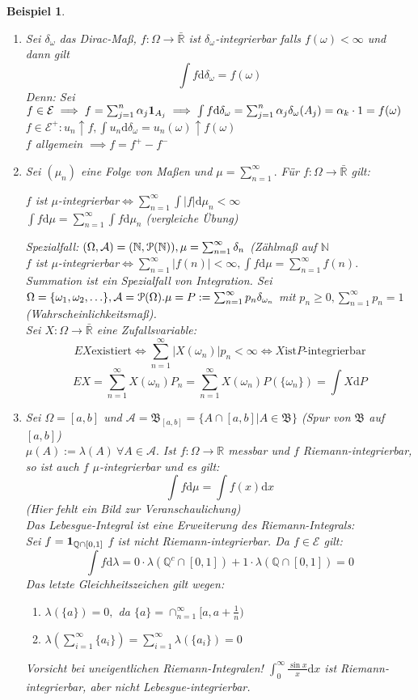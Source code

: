 \documentclass[a4paper,11pt]{book}
\newcommand{\R}{{\mathbb R}}
\newcommand{\N}{{\mathbb N}}
\newcommand{\Q}{{\mathbb Q}}
\newcommand{\ind}{\text{\bf{1}}}
\def\AA{ \mathcal{A} }
\def\PM{ \EuScript{P} }
\def\EE{ \mathcal{E} }
\def\BB{ \mathfrak{B} }
\def\folgt{\ensuremath{\implies}}
\def\equizu{\ensuremath{\iff}}
\def\d{\mbox{d}}
\newtheorem{Bsp}{Beispiel}[chapter]
\theoremstyle{nonumberplain}
\begin{document}
\begin{Bsp}
\begin{enumerate}
\item[a)] Sei $\delta_\omega$ das Dirac-Maß, $f:\Omega\to\bar\R$ ist $\delta_\omega$-integrierbar falls $f(\omega)<\infty$ und dann gilt
$$\int f\mbox{d}\delta_\omega=f(\omega)$$
Denn: Sei $f\in\EE\folgt f=\sum_{j=1}^n \alpha_j \ind_{A_j}\folgt \int f\d\delta_\omega=\sum_{j=1}^n\alpha_j\delta_\omega(A_j)=\alpha_k\cdot 1=f(\omega)$\\
$f\in\EE^+:u_n\uparrow f, \int u_n\d\delta_\omega=u_n(\omega)\uparrow f(\omega)$\\
$f$ allgemein $\folgt f=f^+-f^-$
\item[b)] Sei $(\mu_n)$ eine Folge von Maßen und $\mu=\sum_{n=1}^\infty.$ Für $f:\Omega\to\bar\R$ gilt:
\begin{center}
$f$ ist $\mu$-integrierbar$\equizu\sum_{n=1}^\infty\int |f|\d\mu_n<\infty$\\
$\int f\d\mu = \sum_{n=1}^\infty\int f\d\mu_n$ (vergleiche Übung)
\end{center}
Spezialfall: $(\Omega, \AA)=(\N,\PM(\N)), \mu=\sum_{n=1}^\infty\delta_n$ (Zählmaß auf $\N$\\
$f$ ist $\mu$-integrierbar$\equizu\sum_{n=1}^\infty|f(n)|<\infty, \int f\d\mu=\sum_{n=1}^\infty f(n).$\\
Summation ist ein Spezialfall von Integration. 
Sei $\Omega=\{\omega_1, \omega_2, \ldots\}, \AA=\PM(\Omega). \mu=P:=\sum_{n=1}^\infty p_n\delta_{\omega_n}$ mit $p_n\ge 0, \sum_{n=1}^\infty p_n=1$ (Wahrscheinlichkeitsmaß).\\
Sei $X:\Omega\to\bar\R$ eine Zufallsvariable:
$$EX \text{existiert} \equizu \sum_{n=1}^\infty|X(\omega_n)|p_n<\infty\equizu X \text{ist} P\text{-integrierbar}$$
$$EX = \sum_{n=1}^\infty X(\omega_n)P_n=\sum_{n=1}^\infty X(\omega_n)P(\{\omega_n\})=\int X\d P$$
\item[c)] Sei $\Omega=[a,b]$ und $\AA=\BB_{[a,b]}=\{A\cap [a,b]|A\in\BB\}$ (Spur von $\BB$ auf $[a,b]$)\\
$\mu(A):=\lambda(A)\ \forall A\in\AA.$ Ist $f:\Omega\to\R$ messbar und $f$ Riemann-integrierbar, so ist auch $f$ $\mu$-integrierbar und es gilt:
$$\int f\d\mu=\int f(x)\d x$$
(Hier fehlt ein Bild zur Veranschaulichung)\\
Das Lebesgue-Integral ist eine Erweiterung des Riemann-Integrals:\\
Sei $f=\ind_{\Q\cap [0,1]}$ $f$ ist nicht Riemann-integrierbar. Da $f\in\EE$ gilt:
$$\int f\d\lambda=0\cdot\lambda(\Q^c\cap[0,1])+1\cdot\lambda(\Q\cap[0,1])=0$$
Das letzte Gleichheitszeichen gilt wegen:
\begin{enumerate}
\item[(i)] $\lambda(\{a\})=0,$ da $\{a\}=\cap_{n=1}^\infty[a,a+\frac{1}{n})$
\item[(ii)] $\lambda(\sum_{i=1}^\infty\{a_i\})=\sum_{i=1}^\infty\lambda(\{a_i\})=0$
\end{enumerate}
Vorsicht bei uneigentlichen Riemann-Integralen! $\int_0^\infty\frac{\sin x}{x}\d x$ ist Riemann-integrierbar, aber nicht Lebesgue-integrierbar.
\end{enumerate}
\end{Bsp}
\end{document}
